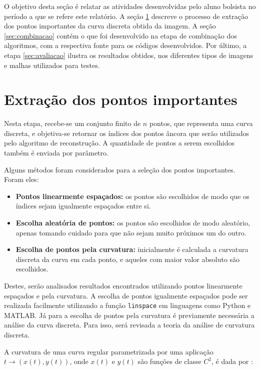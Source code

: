 O objetivo desta seção é relatar as atividades desenvolvidas pelo aluno bolsista no período a que se refere este relatório. A seção \ref{sec:extracao} descreve o processo de extração dos pontos importantes da curva discreta obtida da imagem. A seção \ref{sec:combinacao} contém o que foi desenvolvido na etapa de combinação dos algoritmos, com a respectiva fonte para os códigos desenvolvidos. Por último, a etapa \ref{sec:avaliacao} ilustra os resultados obtidos, nos diferentes tipos de imagens e malhas utilizados para testes.

\section{Extração dos pontos importantes}\label{sec:extracao}

Nesta etapa, recebe-se um conjunto finito de $n$ pontos, que representa uma curva discreta, e objetiva-se retornar os índices dos pontos âncora que serão utilizados pelo algoritmo de reconstrução. A quantidade de pontos a serem escolhidos também é enviada por parâmetro.

Alguns métodos foram considerados para a seleção dos pontos importantes. Foram eles:

\begin{itemize}
    \item \textbf{Pontos linearmente espaçados:} os pontos são escolhidos de modo que os índices sejam igualmente espaçados entre si.
    \item \textbf{Escolha aleatória de pontos:} os pontos são escolhidos de modo aleatório, apenas tomando cuidado para que não sejam muito próximos um do outro.
    \item \textbf{Escolha de pontos pela curvatura:} inicialmente é calculada a curvatura discreta da curva em cada ponto, e aqueles com maior valor absoluto são escolhidos.
\end{itemize}

Destes, serão analisados resultados encontrados utilizando pontos linearmente espaçados e pela curvatura. A escolha de pontos igualmente espaçados pode ser realizada facilmente utilizando a função \texttt{linspace} em linguagens como Python e MATLAB. Já para a escolha de pontos pela curvatura é previamente necessária a análise da curva discreta. Para isso, será revisada a teoria da análise de curvatura discreta.

A curvatura de uma curva regular parametrizada por uma aplicação $t \rightarrow (x(t), y(t))$, onde $x(t)$ e $y(t)$ são funções de classe $C^2$, é dada por \cite{OliveiraMarroquim2020}:

